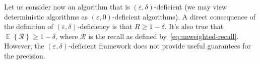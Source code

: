 \documentclass{article}
\newcommand{\Exp}[1]{\mathop{\mathbb{E}}\left\{{#1}\right\}}
\begin{document}
Let us consider now an algorithm that is $(\varepsilon,\delta)$-deficient (we may
view deterministic algorithms as $(\varepsilon,0)$-deficient algorithms). A direct consequence of
the definition of $(\varepsilon,\delta)$-deficiency is that $R\ge 1-\delta$. It's also true that
$\Exp{\mathcal{R}}\ge 1-\delta$, where $\mathcal{R}$ is the recall as defined by~\eqref{eq:unweighted-recall}.
However, the $(\varepsilon,\delta)$-deficient framework does not provide useful guarantees for the precision.

\end{document}
